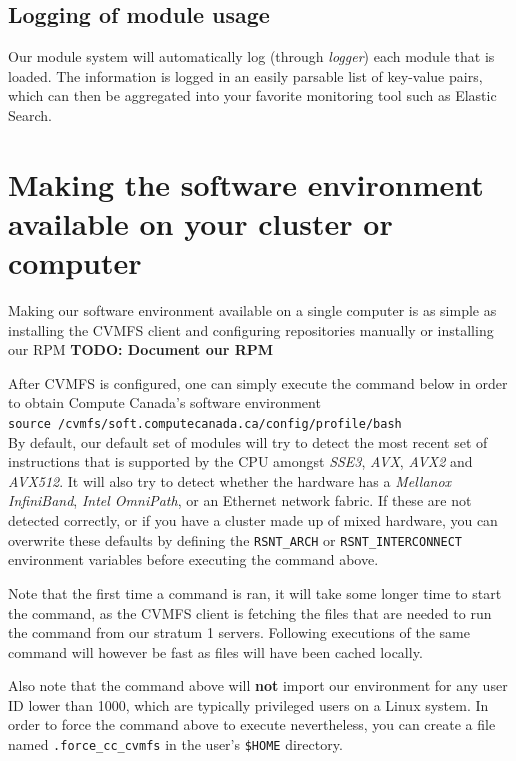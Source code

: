 \documentclass[sigconf]{acmart}
\begin{document}
\subsection{Logging of module usage}
\label{sub:Logging}
Our module system will automatically log (through {\it logger}) each module that is loaded. The information is logged in an easily parsable list of key-value pairs, which can then be aggregated into your favorite monitoring tool such as Elastic Search. 

\section{Making the software environment available on your cluster or computer}
\label{sec:Making_it_available}
Making our software environment available on a single computer is as simple as installing the CVMFS client and configuring repositories manually or installing our RPM
\textbf{TODO: Document our RPM}

After CVMFS is configured, one can simply execute the command below in order to obtain Compute Canada's software environment \\
\texttt{source /cvmfs/soft.computecanada.ca/config/profile/bash} \\

By default, our default set of modules will try to detect the most recent set of instructions that is supported by the CPU amongst {\it SSE3}, {\it AVX}, {\it AVX2} and {\it AVX512}. It will also try to detect whether the hardware has a {\it Mellanox InfiniBand}, {\it Intel OmniPath}, or an Ethernet network fabric. If these are not detected correctly, or if you have a cluster made up of mixed hardware, you can overwrite these defaults by defining the {\verb!RSNT_ARCH!} or {\verb!RSNT_INTERCONNECT!} environment variables before executing the command above. 

Note that the first time a command is ran, it will take some longer time to start the command, as the CVMFS client is fetching the files that are needed to run the command from our stratum 1 servers. Following executions of the same command will however be fast as files will have been cached locally. 

Also note that the command above will \textbf{not} import our environment for any user ID lower than 1000, which are typically privileged users on a Linux system. In order to force the command above to execute nevertheless, you can create a file named \verb!.force_cc_cvmfs! in the user's \verb!$HOME! directory. 
\end{document}

